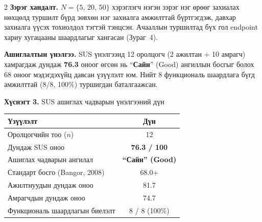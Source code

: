 \begin{multicols}{2}
\textbf{Зэрэг хандалт.} $N=\{5,\,20,\,50\}$ хэрэглэгч нэгэн зэрэг нэг өрөөг захиалах нөхцөлд туршилт бүрд зөвхөн нэг захиалга амжилттай бүртгэгдэж, давхар захиалга үүсэх тохиолдол тэгтэй тэнцсэн. Ачааллын туршилтад бүх гол endpoint хариу хугацааны шаардлагыг хангасан (Зураг~4).

\begin{center}
\end{center}

\textbf{Ашиглалтын үнэлгээ.} SUS үнэлгээнд 12 оролцогч (2 ажилтан + 10 амрагч) хамрагдаж дундаж \textbf{76.3} оноог өгсөн нь ``\textbf{Сайн}'' (Good) ангиллын босгыг болох 68 оноог мэдэгдэхүйц давсан үзүүлэлт юм. Нийт 8 функциональ шаардлага бүгд амжилттай (8/8, 100\%) туршигдан баталгаажсан.

\begin{center}
{\tiny\textbf{Хүснэгт 3.} SUS ашиглах чадварын үнэлгээний дүн}\\[3pt]
{\tiny
\begin{tabular}{|l|c|}
  \hline
  \textbf{Үзүүлэлт} & \textbf{Дүн} \\
  \hline
  Оролцогчийн тоо ($n$)          & 12 \\
  Дундаж SUS оноо                 & \textbf{76.3 / 100} \\
  Ашиглах чадварын ангилал        & \textbf{``Сайн'' (Good)} \\
  Стандарт босго (Bangor, 2008)   & 68.0+ \\
  Ажилтнуудын дундаж оноо         & 81.7 \\
  Амрагчдын дундаж оноо           & 74.7 \\
  Функциональ шаардлагын биелэлт  & 8 / 8 (100\%) \\
  \hline
\end{tabular}
}
\end{center}


\end{multicols}
